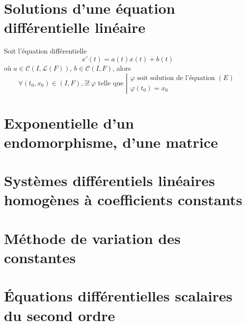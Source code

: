 \documentclass[11pt,a4paper,fleqn,pdftex]{report}
\begin{document}
\section{Solutions d'une équation différentielle linéaire} %
\label{sec:solutions_d_une_equation_differentielle_lineaire}
\begin{itheorem}\label{th:CauchyLipschitz}
Soit l'équation différentielle 
\begin{equation}\tag{$E$}
 x'(t) = a(t) x(t) + b(t)
\end{equation}
où $a \in \mathcal{C}\left( I,\mathscr{L}(F)\right)$, $b\in \mathcal{C}(I,F)$, alors
\begin{equation}
    \forall (t_0,x_0) \in (I,F), \exists ! \: \varphi \text{ telle que }
    \left|
    \begin{array}{l}
        \varphi \text{ soit solution de l'équation }(E)\\
        \varphi(t_0)=x_0
    \end{array}
    \right.
\end{equation}
\end{itheorem}
\section{Exponentielle d'un endomorphisme, d'une matrice} %
\label{sec:exponentielle_d_un_endomorphisme_d_une_matrice}

\section{Systèmes différentiels linéaires homogènes à coefficients constants} %
\label{sec:systemes_differentiels_lineaires_homogenes_coefficients_constants}

\section{Méthode de variation des constantes} %
\label{sec:methode_de_variation_des_constantes}

\section{Équations différentielles scalaires du second ordre} %
\label{sec:equations_differentielles_scalaires_du_second_ordre}
\end{document}
